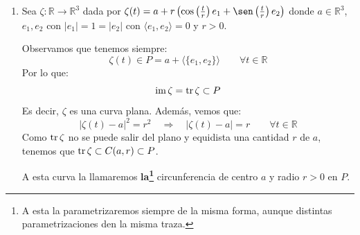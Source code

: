 \begin{ejemplo}
\begin{enumerate}
            Aunque $\varepsilon$ sea diferenciable, $\tr \varepsilon$ tiene ``picos''. Observamos además que $\im \varepsilon$ es la gráfica de la aplicación\footnote{Lo hemos obtenido igualando $x=t^3$, $y=t^2$, despejando $t$ de la primera e igualando en la segunda.} $y=x^{\nicefrac{2}{3}}$. Esta función no es derivable en el origen, a pesar de que la curva sí lo sea.

            \ifshowfigures
            \begin{figure}[H]
                \centering
            \end{figure}
            \fi

        \item Sea $\zeta:\mathbb{R}\to \mathbb{R}^3$ dada por $\zeta(t) = a+r\left(\cos\left(\frac{t}{r}\right)e_1 + \sen\left(\frac{t}{r}\right)e_2\right)$ donde $a\in \mathbb{R}^3$, $e_1,e_2$ con $|e_1| = 1 = |e_2|$ con $\langle e_1,e_2 \rangle =0$ y $r>0$.

            Observamos que tenemos siempre:
            \begin{equation*}
                \zeta(t) \in P = a + \langle \{e_1,e_2\} \rangle \qquad \forall t\in \mathbb{R}
            \end{equation*}
            Por lo que:
            \begin{equation*}
                \operatorname{im} \zeta = \operatorname{tr} \zeta \subset P
            \end{equation*}
            Es decir, $\zeta$ es una curva plana. Además, vemos que:
            \begin{equation*}
                |\zeta(t) - a|^2 = r^2 \quad\Longrightarrow\quad |\zeta(t)-a| = r \qquad \forall t\in \mathbb{R}
            \end{equation*}
            Como $\operatorname{tr} \zeta$ no se puede salir del plano y equidista una cantidad $r$ de $a$, tenemos que $\operatorname{tr} \zeta \subset C(a,r)\subset P$.

            A esta curva la llamaremos \textbf{la\footnote{A esta la parametrizaremos siempre de la misma forma, aunque distintas parametrizaciones den la misma traza.}} circunferencia de centro $a$ y radio $r>0$ en $P$.


\end{enumerate}
\end{ejemplo}
